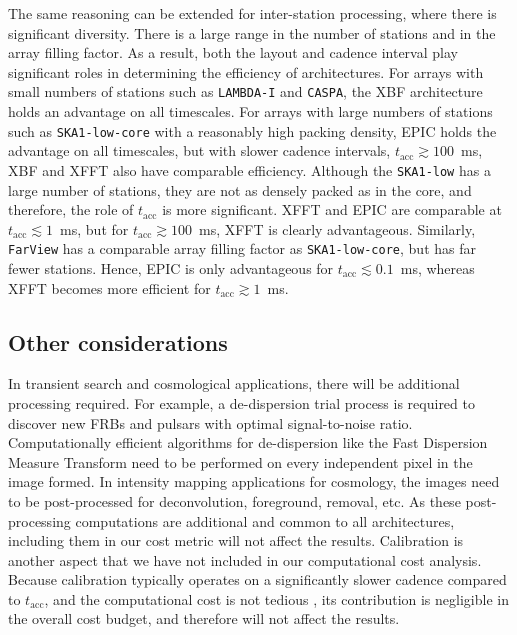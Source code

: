 \documentclass[
  journal=pasa,
  manuscript=article-type,
  year=2020,
  volume=37,
]{cup-journal}
\begin{document}
The same reasoning can be extended for inter-station processing, where there is significant diversity. There is a large range in the number of stations and in the array filling factor. As a result, both the layout and cadence interval play significant roles in determining the efficiency of architectures. For arrays with small numbers of stations such as \texttt{LAMBDA-I} and \texttt{CASPA}, the XBF architecture holds an advantage on all timescales. For arrays with large numbers of stations such as \texttt{SKA1-low-core} with a reasonably high packing density, EPIC holds the advantage on all timescales, but with slower cadence intervals, $t_\textrm{acc}\gtrsim 100$~ms, XBF and XFFT also have comparable efficiency. Although the \texttt{SKA1-low} has a large number of stations, they are not as densely packed as in the core, and therefore, the role of $t_\textrm{acc}$ is more significant. XFFT and EPIC are comparable at $t_\textrm{acc}\lesssim 1$~ms, but for $t_\textrm{acc}\gtrsim 100$~ms, XFFT is clearly advantageous. Similarly, \texttt{FarView} has a comparable array filling factor as \texttt{SKA1-low-core}, but has far fewer stations. Hence, EPIC is only advantageous for $t_\textrm{acc}\lesssim 0.1$~ms, whereas XFFT becomes more efficient for $t_\textrm{acc}\gtrsim 1$~ms. 

\subsection{Other considerations}\label{sec:other-metrics}

In transient search and cosmological applications, there will be additional processing required. For example, a de-dispersion trial process is required to discover new FRBs and pulsars with optimal signal-to-noise ratio. Computationally efficient algorithms for de-dispersion like the Fast Dispersion Measure Transform \citep[FDMT;][]{Zackay+2014} need to be performed on every independent pixel in the image formed. In intensity mapping applications for cosmology, the images need to be post-processed for deconvolution, foreground, removal, etc. As these post-processing computations are additional and common to all architectures, including them in our cost metric will not affect the results. Calibration is another aspect that we have not included in our computational cost analysis. Because calibration typically operates on a significantly slower cadence compared to $t_\textrm{acc}$, and the computational cost is not tedious \citep{Beardsley+2017,Gorthi+2021}, its contribution is negligible in the overall cost budget, and therefore will not affect the results.
\end{document}
